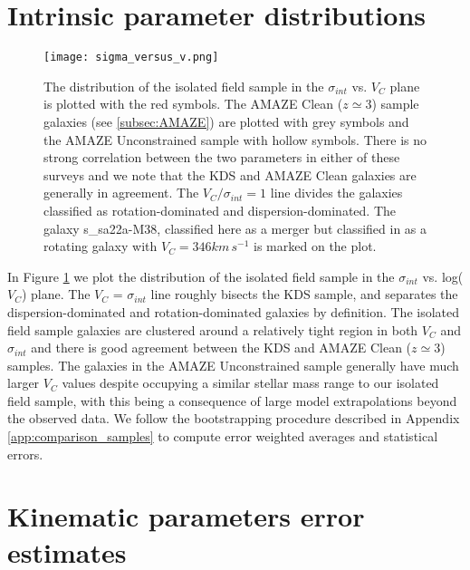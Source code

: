 \documentclass[fleqn,usenatbib]{mnras}
\begin{document}
\section{Intrinsic parameter distributions}

\begin{figure}
\centering \hspace{-1.13cm}
\texttt{[image: sigma\_versus\_v.png]}
\caption{The distribution of the isolated field sample in the $\sigma_{int}$ vs. $V_{C}$ plane is plotted with the red symbols.
The AMAZE Clean ($z\simeq3$) sample galaxies (see \protect\cref{subsec:AMAZE}) are plotted with grey symbols and the AMAZE Unconstrained sample with hollow symbols.    There is no strong correlation between the two parameters in either of these surveys and we note that the KDS and AMAZE Clean galaxies are generally in agreement.
The $V_{C}/\sigma_{int} = 1$ line divides the galaxies classified as rotation-dominated and dispersion-dominated.
The galaxy s\_sa22a-M38, classified here as a merger but classified in \protect\cite{Gnerucci2011} as a rotating galaxy with $V_{C} = 346 km\,s^{-1}$ is marked on the plot.}
\label{fig:intrinsic_parameters}
\end{figure}

In Figure \ref{fig:intrinsic_parameters} we plot the distribution of the isolated field sample in the $\sigma_{int}$ vs. log($V_{C}$) plane. 
The $V_{C}$ = $\sigma_{int}$ line roughly bisects the KDS sample, and separates the dispersion-dominated and rotation-dominated galaxies by definition.
The isolated field sample galaxies are clustered around a relatively tight region in both $V_{C}$ and $\sigma_{int}$ and there is good agreement between the KDS and AMAZE Clean ($z\simeq3$) samples.
The galaxies in the AMAZE Unconstrained sample generally have much larger $V_{C}$ values despite occupying a similar stellar mass range to our isolated field sample, with this being a consequence of large model extrapolations beyond the observed data.
We follow the bootstrapping procedure described in Appendix \ref{app:comparison_samples} to compute error weighted averages and statistical errors.

\section{Kinematic parameters error estimates}\label{app:kin_error_estimates}
\end{document}
